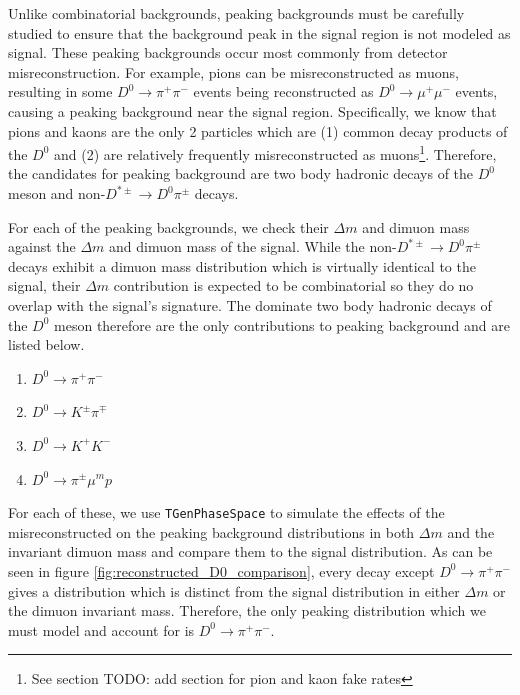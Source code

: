 Unlike combinatorial backgrounds, peaking backgrounds must be carefully studied to ensure that the background peak in the signal region is not modeled as signal. These peaking backgrounds occur most commonly from detector misreconstruction. For example, pions can be misreconstructed as muons, resulting in some $D^0 \to \pi^+ \pi^-$ events being reconstructed as $D^0 \to \mu^+ \mu^-$ events, causing a peaking background near the signal region. Specifically, we know that pions and kaons are the only 2 particles which are (1) common decay products of the $D^0$ and (2) are relatively frequently misreconstructed as muons\footnote{See section TODO: add section for pion and kaon fake rates}. Therefore, the candidates for peaking background are two body hadronic decays of the $D^0$ meson and non-$D^{*\pm} \to D^0 \pi^\pm$ decays. 

For each of the peaking backgrounds, we check their $\Delta m$ and dimuon mass against the $\Delta m$ and dimuon mass of the signal. While the non-$D^{*\pm} \to D^0 \pi^\pm$ decays exhibit a dimuon mass distribution which is virtually identical to the signal, their $\Delta m$ contribution is expected to be combinatorial so they do no overlap with the signal's signature. The dominate two body hadronic decays of the $D^0$ meson therefore are the only contributions to peaking background and are listed below.
\begin{enumerate}
    \item $D^0 \to \pi^+ \pi^-$
    \item $D^0 \to K^\pm \pi^\mp$
    \item $D^0 \to K^+ K^-$
    \item $D^0 \to \pi^\pm \mu^mp$
\end{enumerate}
For each of these, we use \texttt{TGenPhaseSpace} to simulate the effects of the misreconstructed on the peaking background distributions in both $\Delta m$ and the invariant dimuon mass and compare them to the signal distribution. As can be seen in figure \ref{fig:reconstructed_D0_comparison}, every decay except $D^0 \to \pi^+ \pi^-$ gives a distribution which is distinct from the signal distribution in either $\Delta m$ or the dimuon invariant mass. Therefore, the only peaking distribution which we must model and account for is $D^0 \to \pi^+ \pi^-$. 

